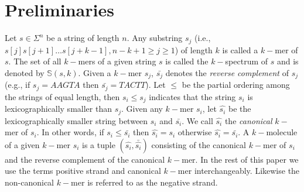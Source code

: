 \documentclass[11pt,conference,twocolumn]{IEEEtran}
\begin{document}
\section{Preliminaries}
\label{sec:prelim}
Let $s \in \Sigma^{n}$ be a string of length $n$. Any substring $s_j$ (i.e., $s[j]s[j+1]\ldots s[j+k-1], n-k+1\geq j\geq 1$) of 
length $k$ is called a $k-$mer of $s$. The set of all $k-$mers of a given string $s$ is called the $k-$spectrum of 
$s$ and is denoted by $\mathbb{S}(s,k)$. Given a $k-$mer $s_j$, $\bar{s_j}$ denotes the {\em reverse complement} of 
$s_j$ (e.g., if $s_j = AAGTA$ then $\bar{s_j} = TACTT$). Let $\leq$ be the partial ordering among the strings of equal 
length, then $s_i \leq s_j$ indicates that the string $s_i$ is lexicographically smaller than $s_j$. Given any $k-$mer $s_i$, 
let $\hat{s_i}$ be the lexicographically smaller string between $s_i$ and $\bar{s_i}$. We call 
$\hat{s_i}$ the {\em canonical} $k-$mer of $s_i$. In other words, if $s_i \leq \bar{s_i}$ then $\hat{s_i} = s_i$ 
otherwise $\hat{s_i} = \bar{s_i}$. A $k-$molecule of a given $k-$mer $s_i$ is a tuple $(\hat{s_i},\bar{\hat{s_i}})$ 
consisting of the canonical $k-$mer of $s_i$ and the reverse complement of the canonical $k-$mer. In the rest of
this paper we use the terms positive strand and canonical $k-$mer interchangeably. Likewise the non-canonical
$k-$mer is referred to as the negative strand.
\end{document}
